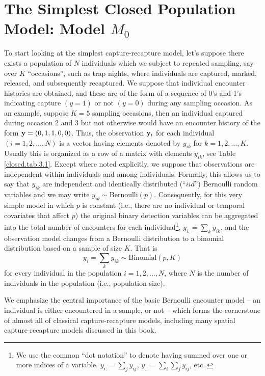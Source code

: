 \section{The Simplest Closed Population Model: Model $M_0$}

To start looking at the simplest capture-recapture model, let's suppose
there exists a population of $N$ individuals which we
subject to repeated sampling, say over $K$ ``occasions'', such as trap nights, where individuals
are captured, marked, released, and subsequently recaptured.  We suppose that
individual encounter histories are obtained, and these are of the form
of a sequence of 0's and 1's indicating capture $(y=1)$ or not $(y=0)$
during any sampling occasion.
As an example, suppose
$K=5$ sampling occasions, then an individual captured during occasion
2 and 3 but not otherwise would have an encounter history of the form
${\bf y}=(0,1,1,0,0)$. Thus, the observation ${\bf y}_{i}$ for each
individual $(i=1,2,\hdots,N)$ is a vector having elements denoted by $y_{ik}$ for
$k=1,2,\hdots,K$. Usually this is organized as a row of a matrix with
elements $y_{ik}$, see Table \ref{closed.tab.3.1}. Except where noted
explicitly, we suppose that observations are independent within
individuals and among individuals.  Formally, this allows us to say
that $y_{ik}$ are independent and identically distributed (``$iid$'')
Bernoulli random variables and we may write $y_{ik}
\sim \mbox{Bernoulli}(p)$.  Consequently, for this very simple model in
which $p$ is constant (i.e., there are no individual or temporal
covariates that affect $p$) the original binary detection variables
can be aggregated into the total 
 number of encounters for each individual\footnote{We use the common
   ``dot notation'' to denote having summed over one or more indices
   of a variable. $y_{i.} = \sum_{j} y_{ij}$, $y_{..} = \sum_{i}
   \sum_{j} y_{ij}$, etc..}, $y_{i.} = \sum_{k} y_{ik}$, and the
observation model changes from a Bernoulli distribution to a
binomial distribution based on a sample of size $K$. That is
\[
y_{i}  = \sum_{k} y_{ik} \sim \mbox{Binomial}(p,K)
\]
for every individual in the population $i=1,2,\ldots,N$, where $N$ is
the number of individuals in the population (i.e., population size).

We emphasize the central importance of the basic Bernoulli encounter model
-- an individual is either encountered in a sample, or not --
 which forms
the cornerstone of almost all of classical
capture-recapture models, including many spatial capture-recapture
models discussed in this book.

